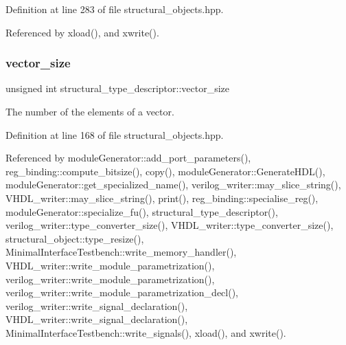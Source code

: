 Definition at line 283 of file structural\+\_\+objects.\+hpp.



Referenced by xload(), and xwrite().

\mbox{\label{structstructural__type__descriptor_a3aa244ccc46c370865016f332e3dddcb}} 
\subsubsection{\texorpdfstring{vector\+\_\+size}{vector\_size}}
{\footnotesize\ttfamily unsigned int structural\+\_\+type\+\_\+descriptor\+::vector\+\_\+size}



The number of the elements of a vector. 



Definition at line 168 of file structural\+\_\+objects.\+hpp.



Referenced by module\+Generator\+::add\+\_\+port\+\_\+parameters(), reg\+\_\+binding\+::compute\+\_\+bitsize(), copy(), module\+Generator\+::\+Generate\+H\+D\+L(), module\+Generator\+::get\+\_\+specialized\+\_\+name(), verilog\+\_\+writer\+::may\+\_\+slice\+\_\+string(), V\+H\+D\+L\+\_\+writer\+::may\+\_\+slice\+\_\+string(), print(), reg\+\_\+binding\+::specialise\+\_\+reg(), module\+Generator\+::specialize\+\_\+fu(), structural\+\_\+type\+\_\+descriptor(), verilog\+\_\+writer\+::type\+\_\+converter\+\_\+size(), V\+H\+D\+L\+\_\+writer\+::type\+\_\+converter\+\_\+size(), structural\+\_\+object\+::type\+\_\+resize(), Minimal\+Interface\+Testbench\+::write\+\_\+memory\+\_\+handler(), V\+H\+D\+L\+\_\+writer\+::write\+\_\+module\+\_\+parametrization(), verilog\+\_\+writer\+::write\+\_\+module\+\_\+parametrization(), verilog\+\_\+writer\+::write\+\_\+module\+\_\+parametrization\+\_\+decl(), verilog\+\_\+writer\+::write\+\_\+signal\+\_\+declaration(), V\+H\+D\+L\+\_\+writer\+::write\+\_\+signal\+\_\+declaration(), Minimal\+Interface\+Testbench\+::write\+\_\+signals(), xload(), and xwrite().

\mbox{\label{structstructural__type__descriptor_a5040be48c7c1996629a6c251fb8342d5}} 
